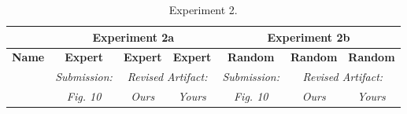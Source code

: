 \begin{table}

\experimentTableSize

\begin{tabular}{l|cccccc}
& \multicolumn{3}{c}{\textbf{Experiment 2a}}
& \multicolumn{3}{c}{\textbf{Experiment 2b}} \\\hline
\textbf{Name} &
\textbf{Expert} & \textbf{Expert} & \textbf{Expert} &
\textbf{Random} & \textbf{Random} & \textbf{Random} \\
&
\textit{Submission:} & \multicolumn{2}{c}{\textit{Revised Artifact:}} &
\textit{Submission:} & \multicolumn{2}{c}{\textit{Revised Artifact:}} \\
&
\textit{Fig. 10} & \textit{Ours} & \textit{Yours} &
\textit{Fig. 10} & \textit{Ours} & \textit{Yours} \\

\end{tabular}

\vspace{0.10in}

\caption{Experiment 2.}

\end{table}
